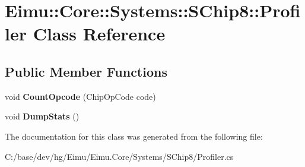 \hypertarget{class_eimu_1_1_core_1_1_systems_1_1_s_chip8_1_1_profiler}{
\section{Eimu::Core::Systems::SChip8::Profiler Class Reference}
\label{class_eimu_1_1_core_1_1_systems_1_1_s_chip8_1_1_profiler}
}
\subsection*{Public Member Functions}
\begin{DoxyCompactItemize}
\item 
\hypertarget{class_eimu_1_1_core_1_1_systems_1_1_s_chip8_1_1_profiler_abc8350607941d16f16d4596f9496b105}{
void {\bfseries CountOpcode} (ChipOpCode code)}
\label{class_eimu_1_1_core_1_1_systems_1_1_s_chip8_1_1_profiler_abc8350607941d16f16d4596f9496b105}

\item 
\hypertarget{class_eimu_1_1_core_1_1_systems_1_1_s_chip8_1_1_profiler_a87a50f2696993d79f3048a33dd5dffe6}{
void {\bfseries DumpStats} ()}
\label{class_eimu_1_1_core_1_1_systems_1_1_s_chip8_1_1_profiler_a87a50f2696993d79f3048a33dd5dffe6}

\end{DoxyCompactItemize}


The documentation for this class was generated from the following file:\begin{DoxyCompactItemize}
\item 
C:/base/dev/hg/Eimu/Eimu.Core/Systems/SChip8/Profiler.cs\end{DoxyCompactItemize}
